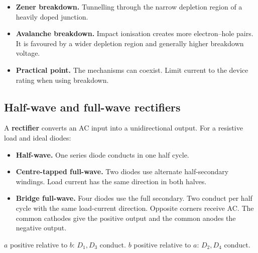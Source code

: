 \documentclass[12pt,a4paper]{article}
\begin{document}
\begin{itemize}[leftmargin=*, itemsep=3pt, topsep=4pt]
  \item \textbf{Zener breakdown.} Tunnelling through the narrow depletion region of a heavily doped junction.
  \item \textbf{Avalanche breakdown.} Impact ionisation creates more electron--hole pairs. It is favoured by a wider depletion region and generally higher breakdown voltage.
  \item \textbf{Practical point.} The mechanisms can coexist. Limit current to the device rating when using breakdown.
\end{itemize}

\subsection{Half-wave and full-wave rectifiers}
A \textbf{rectifier} converts an AC input into a unidirectional output. For a resistive load and ideal diodes:
\begin{itemize}[leftmargin=*, itemsep=3pt, topsep=4pt]
  \item \textbf{Half-wave.} One series diode conducts in one half cycle.
  \item \textbf{Centre-tapped full-wave.} Two diodes use alternate half-secondary windings. Load current has the same direction in both halves.
  \item \textbf{Bridge full-wave.} Four diodes use the full secondary. Two conduct per half cycle with the same load-current direction. Opposite corners receive AC. The common cathodes give the positive output and the common anodes the negative output.
\end{itemize}

\begin{tcolorbox}[tikzbox,title={Bridge rectifier and conducting paths},unbreakable]
\centering
{}
\par\smallskip\small
\(a\) positive relative to \(b\): \(D_1,D_3\) conduct.
\quad \(b\) positive relative to \(a\): \(D_2,D_4\) conduct.
\end{tcolorbox}
\end{document}
